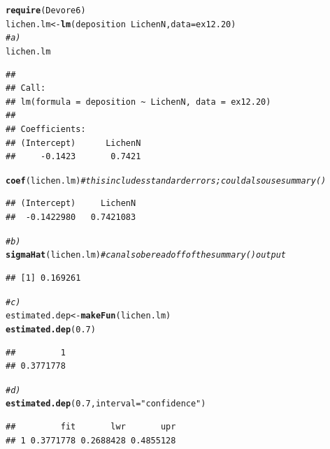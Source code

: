 \documentclass[twoside]{book}\usepackage[]{graphicx}\usepackage[]{xcolor}
\makeatletter
\newcommand{\hlnum}[1]{\textcolor[rgb]{0.686,0.059,0.569}{#1}}%
\newcommand{\hlstr}[1]{\textcolor[rgb]{0.192,0.494,0.8}{#1}}%
\newcommand{\hlcom}[1]{\textcolor[rgb]{0.678,0.584,0.686}{\textit{#1}}}%
\newcommand{\hlopt}[1]{\textcolor[rgb]{0,0,0}{#1}}%
\newcommand{\hlstd}[1]{\textcolor[rgb]{0.345,0.345,0.345}{#1}}%
\newcommand{\hlkwb}[1]{\textcolor[rgb]{0.69,0.353,0.396}{#1}}%
\newcommand{\hlkwc}[1]{\textcolor[rgb]{0.333,0.667,0.333}{#1}}%
\newcommand{\hlkwd}[1]{\textcolor[rgb]{0.737,0.353,0.396}{\textbf{#1}}}%
\newenvironment{kframe}{%
 \def\at@end@of@kframe{}%
 \ifinner\ifhmode%
  \def\at@end@of@kframe{\end{minipage}}%
  \begin{minipage}{\columnwidth}%
 \fi\fi%
 \def\FrameCommand##1{\hskip\@totalleftmargin \hskip-\fboxsep
 \colorbox{shadecolor}{##1}\hskip-\fboxsep
     \hskip-\linewidth \hskip-\@totalleftmargin \hskip\columnwidth}%
 \MakeFramed {\advance\hsize-\width
   \@totalleftmargin\z@ \linewidth\hsize
   \@setminipage}}%
 {\par\unskip\endMakeFramed%
 \at@end@of@kframe}
\newenvironment{knitrout}{}{} %
\makeatother
\begin{document}
\begin{solution}
\begin{knitrout}
\color{fgcolor}\begin{kframe}
\begin{alltt}
\hlkwd{require}\hlstd{(Devore6)}
\hlstd{lichen.lm} \hlkwb{<-} \hlkwd{lm}\hlstd{(deposition} \hlopt{~} \hlstd{LichenN,} \hlkwc{data} \hlstd{= ex12.20)}
\hlcom{# a)}
\hlstd{lichen.lm}
\end{alltt}
\begin{verbatim}
## 
## Call:
## lm(formula = deposition ~ LichenN, data = ex12.20)
## 
## Coefficients:
## (Intercept)      LichenN  
##     -0.1423       0.7421
\end{verbatim}
\begin{alltt}
\hlkwd{coef}\hlstd{(lichen.lm)}  \hlcom{# this includes standard errors; could also use summary() }
\end{alltt}
\begin{verbatim}
## (Intercept)     LichenN 
##  -0.1422980   0.7421083
\end{verbatim}
\begin{alltt}
\hlcom{# b)}
\hlkwd{sigmaHat}\hlstd{(lichen.lm)}  \hlcom{# can also be read off of the summary() output}
\end{alltt}
\begin{verbatim}
## [1] 0.169261
\end{verbatim}
\begin{alltt}
\hlcom{# c)}
\hlstd{estimated.dep} \hlkwb{<-} \hlkwd{makeFun}\hlstd{(lichen.lm)}
\hlkwd{estimated.dep}\hlstd{(}\hlnum{0.7}\hlstd{)}
\end{alltt}
\begin{verbatim}
##         1 
## 0.3771778
\end{verbatim}
\begin{alltt}
\hlcom{# d)}
\hlkwd{estimated.dep}\hlstd{(}\hlnum{0.7}\hlstd{,} \hlkwc{interval} \hlstd{=} \hlstr{"confidence"}\hlstd{)}
\end{alltt}
\begin{verbatim}
##         fit       lwr       upr
## 1 0.3771778 0.2688428 0.4855128
\end{verbatim}
\end{kframe}
\end{knitrout}
\end{solution}
\end{document}
